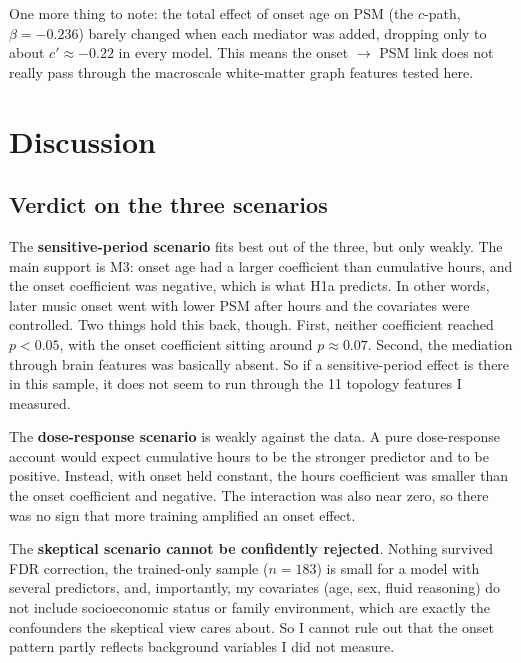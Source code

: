 \documentclass[11pt]{article}
\begin{document}
One more thing to note: the total effect of onset age on PSM (the $c$-path, $\beta=-0.236$) barely changed when each mediator was added, dropping only to about $c' \approx -0.22$ in every model. This means the onset $\to$ PSM link does not really pass through the macroscale white-matter graph features tested here.




\section{Discussion}

\subsection{Verdict on the three scenarios}

The \textbf{sensitive-period scenario} fits best out of the three, but only weakly. The main support is M3: onset age had a larger coefficient than cumulative hours, and the onset coefficient was negative, which is what H1a predicts. In other words, later music onset went with lower PSM after hours and the covariates were controlled. Two things hold this back, though. First, neither coefficient reached $p<0.05$, with the onset coefficient sitting around $p\approx0.07$. Second, the mediation through brain features was basically absent. So if a sensitive-period effect is there in this sample, it does not seem to run through the 11 topology features I measured.

The \textbf{dose-response scenario} is weakly against the data. A pure dose-response account would expect cumulative hours to be the stronger predictor and to be positive. Instead, with onset held constant, the hours coefficient was smaller than the onset coefficient and negative. The interaction was also near zero, so there was no sign that more training amplified an onset effect.

The \textbf{skeptical scenario cannot be confidently rejected}. Nothing survived FDR correction, the trained-only sample ($n=183$) is small for a model with several predictors, and, importantly, my covariates (age, sex, fluid reasoning) do not include socioeconomic status or family environment, which are exactly the confounders the skeptical view cares about. So I cannot rule out that the onset pattern partly reflects background variables I did not measure.
\end{document}
